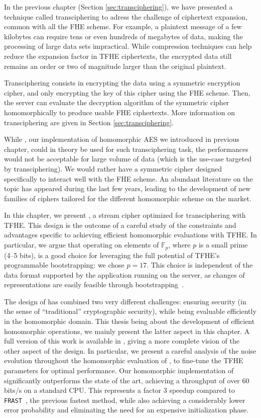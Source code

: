 In the previous chapter (Section \ref{sec:transciphering}), we have presented a technique called transciphering to adress the challenge of ciphertext expansion, common with all the FHE scheme. For example, a plaintext message of a few kilobytes can require tens or even hundreds of megabytes of data, making the processing of large data sets impractical. While compression techniques can help reduce the expansion factor in TFHE ciphertexts, the encrypted data still remains an order or two of magnitude larger than the original plaintext.


Transciphering consists in encrypting the data using a symmetric encryption cipher, and only encrypting the key of this cipher using the FHE scheme. Then, the server can evaluate the decryption algorithm of the symmetric cipher homomorphically to produce usable FHE ciphertexts. More information on transciphering are given in Section \ref{sec:transciphering}.


While \hippo, our implementation of homomorphic AES we introduced in previous chapter, could in theory be used for such transciphering task, the performances would not be acceptable for large volume of data (which is the use-case targeted by transciphering). We would rather have a symmetric cipher designed specifically to interact well with the FHE scheme. An abundant literature on the topic has appeared during the last few years, leading to the development of new families of ciphers tailored for the different homomorphic scheme on the market.


In this chapter, we present \coolName{}, a stream cipher optimized for transciphering with TFHE. This design is the outcome of a careful study of the constraints and advantages specific to achieving efficient homomorphic evaluations with TFHE. In particular, we argue that operating on elements of $\mathbb{F}_p$, where $p$ is a small prime (4--5 bits), is a good choice for leveraging the full potential of TFHE’s programmable bootstrapping: we chose $p=17$. This choice is independent of the data format supported by the application running on the server, as changes of representations are easily feasible through bootstrapping~\cite{JC:BBBCLO23}.


The design of \coolName has combined two very different challenges: ensuring security (in the sense of ``traditional'' cryptographic security), while being evaluable efficiently in the homomorphic domain. This thesis being about the development of efficient homomorphic operations, we mainly present the latter aspect in this chapter. A full version of this work is available in \cite{EPRINT:BBBBCL25}, giving a more complete vision of the other aspect of the design. In particular, we present a careful analysis of the noise evolution throughout  the homomorphic evaluation of \coolName, to fine-tune the TFHE parameters for optimal performance. Our homomorphic implementation of \coolName{} significantly outperforms the state of the art, achieving a throughput of over 60 bits/s on a standard CPU. This represents a factor 3 speedup compared to \texttt{FRAST}~\cite{ToSC:CCHLOS24}, the previous fastest method, while also achieving a considerably lower error probability and eliminating the need for an expensive initialization phase.


